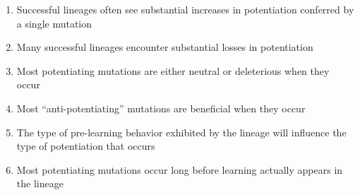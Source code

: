 \begin{enumerate}
    \item Successful lineages often see substantial increases in potentiation conferred by a single mutation
    \item Many successful lineages encounter substantial losses in potentiation
    \item Most potentiating mutations are either neutral or deleterious when they occur
    \item Most ``anti-potentiating'' mutations are beneficial when they occur
    \item The type of pre-learning behavior exhibited by the lineage will influence the type of potentiation that occurs
    \item Most potentiating mutations occur long before learning actually appears in the lineage
\end{enumerate}